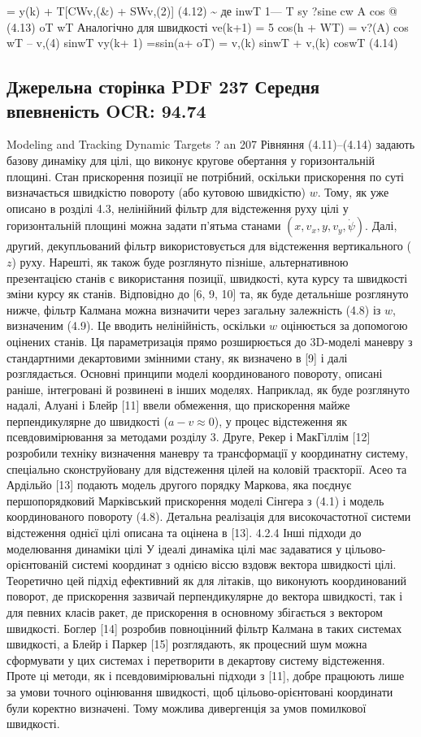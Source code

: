 \documentclass[11pt]{article}
\begin{document}
= y(k) + T[CWv,(\&) + SWv,(2)] (4.12)
\textasciitilde{} де
inwT 1--- T
sy ?sine cw A cos @ (4.13)
oT wT
Аналогічно для швидкості
ve(k+1) = 5 cos(h + WT) = v?(A) cos wT -- v,(4) sinwT
vy(k+ 1) =ssin(a+ oT) = v,(k) sinwT + v,(k) coswT (4.14)
\clearpage\subsection*{Джерельна сторінка PDF 237 \quad Середня впевненість OCR: 94.74}
Modeling and Tracking Dynamic Targets ? an 207
Рівняння (4.11)–(4.14) задають базову динаміку
для цілі, що виконує кругове обертання у горизонтальній площині. Стан
прискорення позиції не потрібний, оскільки прискорення по суті визначається
швидкістю повороту (або кутовою швидкістю) $w$. Тому, як уже описано
в розділі 4.3, нелінійний фільтр для відстеження руху цілі у горизонтальній площині
можна задати п'ятьма станами $(x, v_x, y, v_y, \dot\psi)$. Далі,
другий, декупльований фільтр використовується для відстеження вертикального
($z$) руху. Нарешті, як також буде розглянуто пізніше, альтернативною
презентацією станів є використання позиції, швидкості, кута курсу та швидкості
зміни курсу як станів.
Відповідно до [6, 9, 10] та, як буде детальніше розглянуто нижче, фільтр Калмана
можна визначити через загальну залежність (4.8) із $w$, визначеним (4.9).
Це вводить нелінійність, оскільки $w$ оцінюється за допомогою оцінених станів.
Ця параметризація прямо розширюється до 3D-моделі маневру з
стандартними декартовими змінними стану, як визначено в [9] і далі розглядається.
Основні принципи моделі координованого повороту, описані раніше,
інтегровані й розвинені в інших моделях. Наприклад, як буде розглянуто
надалі, Алуані і Блейр [11] ввели обмеження, що прискорення майже
перпендикулярне до швидкості ($a-v\approx0$), у процес відстеження як
псевдовимірювання за методами розділу 3. Друге, Рекер і МакГіллім [12] розробили
техніку визначення маневру та трансформації у координатну систему, спеціально
сконструйовану для відстеження цілей на коловій траєкторії.
Асео та Ардільйо [13] подають модель другого порядку Маркова, яка поєднує
першопорядковий Марківський прискорення моделі Сінгера з (4.1) і модель
координованого повороту (4.8). Детальна реалізація для високочастотної системи
відстеження однієї цілі описана та оцінена в [13].
4.2.4 Інші підходи до моделювання динаміки цілі
У ідеалі динаміка цілі має задаватися у цільово-орієнтованій системі координат
з однією віссю вздовж вектора швидкості цілі. Теоретично цей підхід ефективний
як для літаків, що виконують координований поворот, де прискорення зазвичай
перпендикулярне до вектора швидкості, так і для певних класів ракет, де
прискорення в основному збігається з вектором швидкості. Боглер [14] розробив
повноцінний фільтр Калмана в таких системах швидкості, а Блейр і Паркер [15]
розглядають, як процесний шум можна сформувати у цих системах і
перетворити в декартову систему відстеження. Проте ці методи, як і
псевдовимірювальні підходи з [11], добре працюють лише за умови точного
оцінювання швидкості, щоб цільово-орієнтовані координати були коректно
визначені. Тому можлива дивергенція за умов помилкової швидкості.
\end{document}
